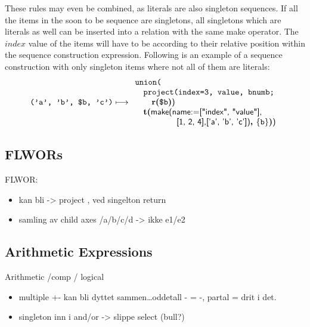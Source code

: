 These rules may even be combined, as literals are also singleton sequences. If all the items in the soon to 
be sequence are singletons, all singletons which are literals as well can be inserted into a relation with
the same \textsf{make} operator. The $index$ value of the items will have to be according to their relative 
position within the sequence construction expression. Following is an example of a sequence construction with
only singleton items where not all of them are literals:
\begin{equation*}
\mbox{\texttt{('a', 'b', \$b, 'c')}}\longmapsto
\begin{array}{l}
\mbox{\texttt{union(}} \\ \quad
\mbox{\texttt{project(index=3, value, bnumb;}} \\ \quad \quad
\mbox{\textbf{r(}}\texttt{\$b}\mbox{\textbf{)}\textsf{)}} \\ \quad
\mbox{\textbf{t(}}
\mbox{\textsf{make(name:=["index", "value"],}} \\ \quad \quad \quad \quad \quad 
\mbox{\textsf{[1, 2, 4],['a', 'b', 'c'])}\textbf{,
}}\{\mbox{\texttt{b}}\}\mbox{\textbf{)}\textsf{)}}
\end{array}
\end{equation*}
      

\subsection{FLWORs}
\label{sect:trans:TD:simpl:flwor}        
  FLWOR:
  	\begin{itemize}
        \item  kan bli -> project , ved singelton return
		\item samling av child axes /a/b/c/d -> ikke e1/e2
      \end{itemize}

\subsection{Arithmetic Expressions}
\label{sect:trans:TD:simpl:arith}         
  Arithmetic /comp / logical
	\begin{itemize}
      \item multiple +- kan bli dyttet sammen\ldots oddetall - = -, partal = drit i det.
      \item singleton inn i and/or -> slippe select (bull?)
    \end{itemize}
